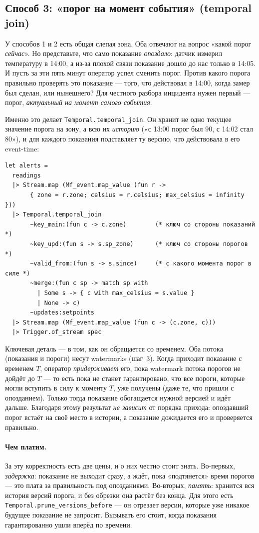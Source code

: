 \documentclass[11pt,a4paper]{article}
\begin{document}
\subsection{Способ 3: «порог на момент события» (temporal join)}

У способов 1 и 2 есть общая слепая зона. Оба отвечают на вопрос «какой
порог \emph{сейчас}». Но представьте, что само показание \emph{опоздало}:
датчик измерил температуру в 14:00, а из-за плохой связи показание
дошло до нас только в 14:05. И пусть за эти пять минут оператор успел
сменить порог. Против какого порога правильно проверять это показание ---
того, что действовал в 14:00, когда замер был сделан, или нынешнего?
Для честного разбора инцидента нужен первый --- порог, \emph{актуальный
на момент самого события}.

Именно это делает \texttt{Temporal.temporal\_join}. Он хранит не одно
текущее значение порога на зону, а всю их \emph{историю} («с 13:00
порог был 90, с 14:02 стал 80»), и для каждого показания подставляет
ту версию, что действовала в его event-time:

\begin{lstlisting}
let alerts =
  readings
  |> Stream.map (Mf_event.map_value (fun r ->
       { zone = r.zone; celsius = r.celsius; max_celsius = infinity }))
  |> Temporal.temporal_join
       ~key_main:(fun c -> c.zone)        (* ключ со стороны показаний *)
       ~key_upd:(fun s -> s.sp_zone)      (* ключ со стороны порогов *)
       ~valid_from:(fun s -> s.since)     (* с какого момента порог в силе *)
       ~merge:(fun c sp -> match sp with
         | Some s -> { c with max_celsius = s.value }
         | None -> c)
       ~updates:setpoints
  |> Stream.map (Mf_event.map_value (fun c -> (c.zone, c)))
  |> Trigger.of_stream spec
\end{lstlisting}

Ключевая деталь --- в том, как он обращается со временем. Оба потока
(показания и пороги) несут watermarks (шаг~3). Когда приходит
показание с временем $T$, оператор \emph{придерживает} его, пока
watermark потока порогов не дойдёт до $T$ --- то есть пока не станет
гарантировано, что все пороги, которые могли вступить в силу к моменту
$T$, уже получены (даже те, что пришли с опозданием). Только тогда
показание обогащается нужной версией и идёт дальше. Благодаря этому
результат \emph{не зависит} от порядка прихода: опоздавший порог встаёт
на своё место в истории, а показание дожидается его и проверяется
правильно.

\paragraph{Чем платим.} За эту корректность есть две цены, и о них
честно стоит знать. Во-первых, \emph{задержка}: показание не выходит
сразу, а ждёт, пока «подтянется» время порогов --- это плата за
правильность под опозданиями. Во-вторых, \emph{память}: хранится вся
история версий порога, и без обрезки она растёт без конца. Для этого
есть \texttt{Temporal.prune\_versions\_before} --- он отрезает версии,
которые уже никакое будущее показание не запросит. Вызывать его стоит,
когда показания гарантированно ушли вперёд по времени.
\end{document}
